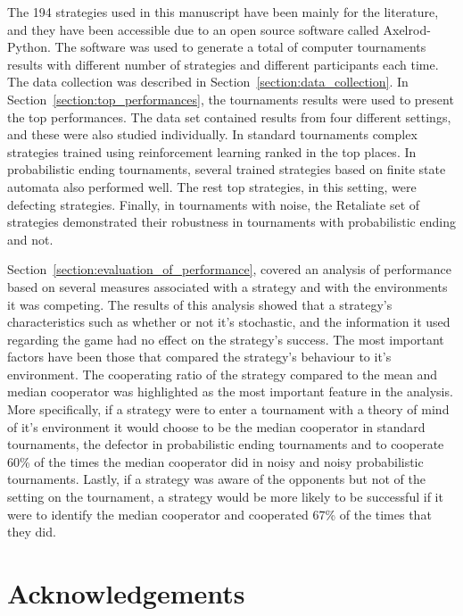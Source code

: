 \documentclass{article}
\newcommand{\numberofalltournaments}{}
\begin{document}
The 194 strategies used in this manuscript have been mainly for the literature,
and they have been accessible due to an open source software called
Axelrod-Python. The software was used to generate a total of
\numberofalltournaments computer tournaments results with different number of
strategies and different participants each time. The data collection was
described in Section~\ref{section:data_collection}. In
Section~\ref{section:top_performances}, the tournaments results were used to
present the top performances.
The data set contained results from four different settings, and these were also
studied individually. In standard tournaments complex strategies trained using
reinforcement learning ranked in the top places. In probabilistic ending
tournaments, several trained strategies based on finite state automata also
performed well. The rest top strategies, in this setting, were defecting
strategies. Finally, in tournaments with noise, the Retaliate set of strategies
demonstrated their robustness in tournaments with probabilistic ending and not.

Section~\ref{section:evaluation_of_performance}, covered an analysis of
performance based on several measures associated with a strategy and with the
environments it was competing. The results of this analysis showed that a
strategy's characteristics such as whether or not it's stochastic, and the information it
used regarding the game had no effect on the strategy's success. The most
important factors have been those that compared the strategy's behaviour to it's
environment. The cooperating ratio of the strategy compared to the mean and
median cooperator was highlighted as the most important feature in the analysis.
More specifically, if a strategy were to enter a tournament with a theory of
mind of it's environment it would choose to be the median cooperator in standard
tournaments, the defector in probabilistic ending tournaments and to cooperate
60\% of the times the median cooperator did in noisy and noisy probabilistic
tournaments. Lastly, if a strategy was aware of the opponents but not of the
setting on the tournament, a strategy would be more likely to be successful if
it were to identify the median cooperator and cooperated 67\% of the times that
they did.




\section{Acknowledgements}
\end{document}
